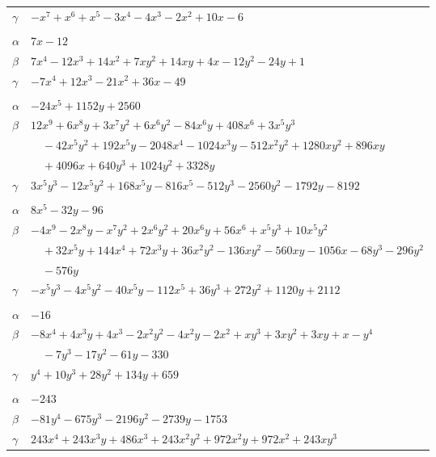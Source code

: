 \documentclass[11pt]{article}
\begin{document}
\begin{longtable}{@{}ll@{}}
$\gamma$ & $-x^{7}+x^{6}+x^{5}-3x^{4}-4x^{3}-2x^{2}+10x-6$\\
\addlinespace[3pt]
\multicolumn{2}{@{}l}{$\{i,j\}=\{11,23\}$, $k_{ij}=3$}\\
$\alpha$ & $7x-12$\\
$\beta$ & $7x^{4}-12x^{3}+14x^{2}+7xy^{2}+14xy+4x-12y^{2}-24y+1$\\
$\gamma$ & $-7x^{4}+12x^{3}-21x^{2}+36x-49$\\
\addlinespace[3pt]
\multicolumn{2}{@{}l}{$\{i,j\}=\{12,26\}$, $k_{ij}=2^{11}\cdot 13$}\\
$\alpha$ & $-24x^{5}+1152y+2560$\\
$\beta$ & $12x^{9}+6x^{8}y+3x^{7}y^{2}+6x^{6}y^{2}-84x^{6}y+408x^{6}+3x^{5}y^{3}$\\
 & $\quad -42x^{5}y^{2}+192x^{5}y-2048x^{4}-1024x^{3}y-512x^{2}y^{2}+1280xy^{2}+896xy$\\
 & $\quad +4096x+640y^{3}+1024y^{2}+3328y$\\
$\gamma$ & $3x^{5}y^{3}-12x^{5}y^{2}+168x^{5}y-816x^{5}-512y^{3}-2560y^{2}-1792y-8192$\\
\addlinespace[3pt]
\multicolumn{2}{@{}l}{$\{i,j\}=\{12,31\}$, $k_{ij}=2^{8}\cdot 3\cdot 5$}\\
$\alpha$ & $8x^{5}-32y-96$\\
$\beta$ & $-4x^{9}-2x^{8}y-x^{7}y^{2}+2x^{6}y^{2}+20x^{6}y+56x^{6}+x^{5}y^{3}+10x^{5}y^{2}$\\
 & $\quad +32x^{5}y+144x^{4}+72x^{3}y+36x^{2}y^{2}-136xy^{2}-560xy-1056x-68y^{3}-296y^{2}$\\
 & $\quad -576y$\\
$\gamma$ & $-x^{5}y^{3}-4x^{5}y^{2}-40x^{5}y-112x^{5}+36y^{3}+272y^{2}+1120y+2112$\\
\addlinespace[3pt]
\multicolumn{2}{@{}l}{$\{i,j\}=\{13,15\}$, $k_{ij}=2^{4}\cdot 3^{2}\cdot 11$}\\
$\alpha$ & $-16$\\
$\beta$ & $-8x^{4}+4x^{3}y+4x^{3}-2x^{2}y^{2}-4x^{2}y-2x^{2}+xy^{3}+3xy^{2}+3xy+x-y^{4}$\\
 & $\quad -7y^{3}-17y^{2}-61y-330$\\
$\gamma$ & $y^{4}+10y^{3}+28y^{2}+134y+659$\\
\addlinespace[3pt]
\multicolumn{2}{@{}l}{$\{i,j\}=\{13,16\}$, $k_{ij}=17$}\\
$\alpha$ & $-243$\\
$\beta$ & $-81y^{4}-675y^{3}-2196y^{2}-2739y-1753$\\
$\gamma$ & $243x^{4}+243x^{3}y+486x^{3}+243x^{2}y^{2}+972x^{2}y+972x^{2}+243xy^{3}$\\

\end{longtable}
\end{document}
